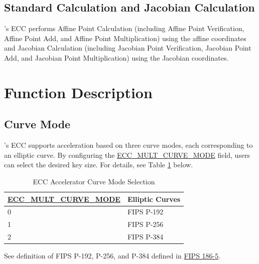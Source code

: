 \documentclass[main\_\_EN.tex]{subfiles}
\begin{document}
\subsection{Standard Calculation and Jacobian Calculation}

\chipname{}'s ECC performs Affine Point Calculation (including Affine Point Verification, Affine Point Add, and Affine Point Multiplication) using the affine coordinates and Jacobian Calculation (including Jacobian Point Verification, Jacobian Point Add, and Jacobian Point Multiplication) using the Jacobian coordinates.

\section{Function Description}
\label{sec:ecc-mode-config}
\subsection{Curve Mode}

\chipname{}'s ECC supports acceleration based on three curve modes, each corresponding to an elliptic curve. By configuring the \hyperref[fielddesc:ECCMULTCURVEMODE]{ECC\_MULT\_CURVE\_MODE} field, users can select the desired key size. For details, see Table \ref{tab:ecc-curve-mode} below.

\begin{table}[H]
    \centering
    \caption{ECC Accelerator Curve Mode Selection}
    \label{tab:ecc-curve-mode}
    \begin{threeparttable}
    \begin{tabular}{|p{4.2cm}|p{3.6cm}|}
    \hline
        \rowcolor{lightgray}
        \textbf{\hyperref[fielddesc:ECCMULTCURVEMODE]{ECC\_MULT\_CURVE\_MODE}} & \textbf{Elliptic Curves\tnote{*}} \\ \hline
        0 & FIPS P-192  \\\hline
        1 & FIPS P-256  \\\hline
        2 & FIPS P-384  \\\hline
    \end{tabular}
    \begin{tablenotes}
        \item[*] See definition of FIPS P-192, P-256, and P-384 defined in \href{https://nvlpubs.nist.gov/nistpubs/FIPS/NIST.FIPS.186-5.pdf}{FIPS 186-5}.
    \end{tablenotes}
    \end{threeparttable}
\end{table}
\end{document}
